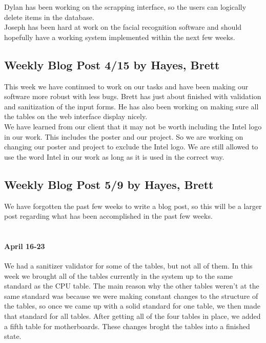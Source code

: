 \documentclass[10pt, onecolumn, twoside, peerreview]{IEEEtran}
\begin{document}
Dylan has been working on the scrapping interface, so the users can logically delete items in the database.​\\

Joseph has been hard at work on the facial recognition software and should hopefully have a working system implemented within the next few weeks.​

\subsection{Weekly Blog Post 4/15 by Hayes, Brett}
This week we have continued to work on our tasks and have been making our software more​ robust with less bugs. Brett has just about finished with validation and sanitization of the input forms. He has also been working on making sure all the tables on the web interface display nicely.\\

​We have learned from our client that it may not be worth including the Intel logo in our work. This includes the poster and our project. So we are working on changing our poster and project to exclude the Intel logo. We are still allowed to use the word Intel in our work as long as it is used in the correct way.

\subsection{Weekly Blog Post 5/9 by Hayes, Brett}
We have forgotten the past few weeks to write a blog post, so this will be a larger post regarding what has been accomplished in the past few weeks.\\



​​\paragraph*{April 16-​​23}

We had a sanitizer validator for some of the tables, but not all of them. In this week we brought all of the tables currently in the system up to the same standard as the CPU table. The main reason why the other tables weren't at the same standard was because we were making constant changes to the structure of the tables, so once we came up with a solid standard for one table, we then made that standard for all tables.​ After getting all of the four tables in place, we added a fifth table for motherboards. These changes broght the tables into a finished state.\\
\end{document}
